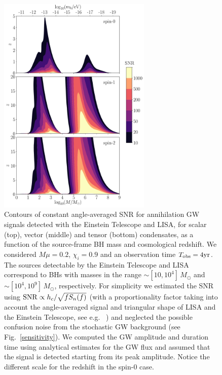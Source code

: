 \documentclass[11pt]{article}
\numberwithin{equation}{section} %
\begin{document}
%
\begin{figure}
\begin{center}
\includegraphics[width=0.65\textwidth]{waterfall_allspins.pdf}
\caption{Contours of constant angle-averaged SNR for annihilation GW signals detected with the Einstein Telescope and LISA, for scalar (top), vector (middle) and tensor (bottom) condensates, as a function of the source-frame BH mass and cosmological redshift. We considered $M\mu=0.2$, $\chi_i=0.9$ and an observation time $T_{\rm obs}=4 {\rm yr}$. The sources detectable by the Einstein Telescope and LISA correspond to BHs with masses in the range $\sim [10,10^4]\, M_{\odot}$ and $\sim [10^4,10^9]\, M_{\odot}$, respectively.
%
For simplicity we estimated the SNR using ${\rm SNR}\propto h_c/\sqrt{f S_n(f)}$ (with a proportionality factor taking into account the angle-averaged signal and triangular shape of LISA and the Einstein Telescope, see e.g. ~\cite{Berti:2005ys,Regimbau:2012ir}) and neglected the possible confusion noise from the stochastic GW background (see Fig.~\ref{sensitivity}). We computed the GW amplitude and duration time using analytical estimates for the GW flux and assumed that the signal is detected starting from its peak amplitude.
%
Notice the different scale for the redshift in the spin-0 case.
\label{fig:waterfall}}
\end{center}
\end{figure}
%
\end{document}
